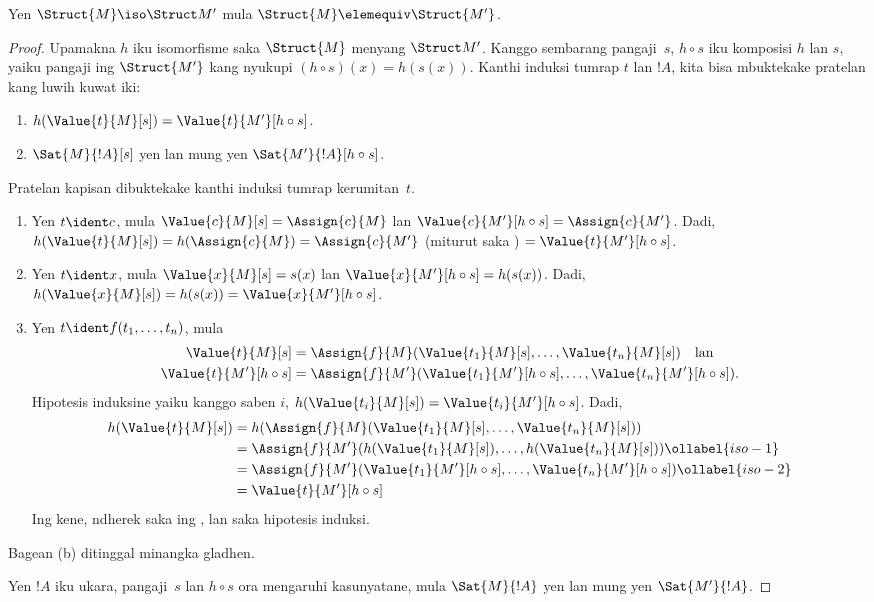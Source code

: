 \documentclass[../../../include/open-logic-section]{subfiles}
\begin{document}
\begin{thm}
Yen $\Struct{M} \iso \Struct M'$
mula $\Struct{M} \elemequiv
\Struct{M'}$.
\end{thm}

\begin{proof}
Upamakna $h$ iku isomorfisme
saka $\Struct{M}$ menyang
$\Struct M'$. Kanggo
sembarang pangaji~$s$,
$h \circ s$ iku komposisi
$h$ lan $s$, yaiku
pangaji ing
$\Struct{M'}$ kang nyukupi
$(h \circ s)(x) = h(s(x))$.
Kanthi induksi tumrap
$t$ lan $!A$, kita
bisa mbuktekake pratelan
kang luwih kuwat iki:
\begin{enumerate}
  \item[a.] $h(\Value{t}{M}[s]) = \Value{t}{M'}[h\circ s]$.
  \item[b.] $\Sat{M}{!A}[s]$ yen lan mung yen
    $\Sat{M'}{!A}[h \circ s]$.
\end{enumerate}
Pratelan kapisan dibuktekake
kanthi induksi tumrap
kerumitan~$t$.
\begin{enumerate}
\item Yen $t \ident c$, mula
  $\Value{c}{M}[s] = \Assign{c}{M}$
  lan $\Value{c}{M'}[h \circ s] =
  \Assign{c}{M'}$. Dadi,
  $h(\Value{t}{M}[s]) =
  h(\Assign{c}{M}) = \Assign{c}{M'}$
  (miturut 
  saka )
  $= \Value{t}{M'}[h \circ s]$.
\item Yen $t \ident x$, mula
  $\Value{x}{M}[s] = s(x)$
  lan $\Value{x}{M'}[h \circ s] =
  h(s(x))$. Dadi,
  $h(\Value{x}{M}[s]) =
  h(s(x)) = \Value{x}{M'}[h \circ s]$.
\item Yen $t \ident f(t_1, \dots, t_n)$,
  mula
  \begin{align*}
    \Value{t}{M}[s] & = \Assign{f}{M}(\Value{t_1}{M}[s], \dots, \Value{t_n}{M}[s]) \quad\text{lan}\\
  \Value{t}{M'}[h \circ s] & = \Assign{f}{M'}(\Value{t_1}{M'}[h \circ
    s], \dots, \Value{t_n}{M'}[h \circ s]).
  \end{align*}
  Hipotesis induksine yaiku kanggo saben $i$,
  $h(\Value{t_i}{M}[s])
  = \Value{t_i}{M'}[h\circ s]$.
  Dadi,
  \begin{align}
    h(\Value{t}{M}[s])
    & = h(\Assign{f}{M}(\Value{t_1}{M}[s], \dots, \Value{t_n}{M}[s])) \notag\\
    & = \Assign{f}{M'}(h(\Value{t_1}{M}[s]), \dots,
    h(\Value{t_n}{M}[s])) \ollabel{iso-1}\\
    & = \Assign{f}{M'}(\Value{t_1}{M'}[h \circ s], \dots,
    \Value{t_n}{M'}[h \circ s]) \ollabel{iso-2}\\
    & = \Value{t}{M'}[h\circ s] \notag
  \end{align}
  Ing kene, 
  ndherek saka 
  ing ,
  lan  saka
  hipotesis induksi.
\end{enumerate}
Bagean (b) ditinggal minangka gladhen.

Yen $!A$ iku ukara,
pangaji~$s$ lan
$h \circ s$ ora mengaruhi
kasunyatane, mula
$\Sat{M}{!A}$ yen lan
mung yen $\Sat{M'}{!A}$.
\end{proof}
\end{document}
